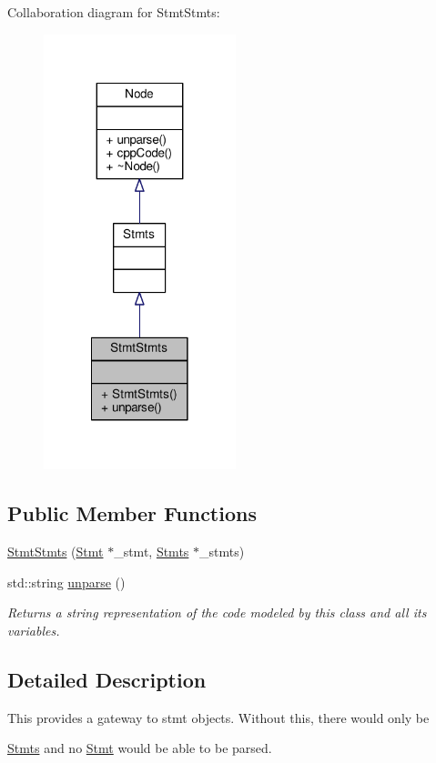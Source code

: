 Collaboration diagram for Stmt\-Stmts\-:\nopagebreak
\begin{figure}[H]
\begin{center}
\leavevmode
\includegraphics[width=158pt]{classStmtStmts__coll__graph}
\end{center}
\end{figure}
\subsection*{Public Member Functions}
\begin{DoxyCompactItemize}
\item 
\hyperlink{classStmtStmts_a41bd52f6dc41274d39f74fd58033f653}{Stmt\-Stmts} (\hyperlink{classStmt}{Stmt} $\ast$\-\_\-stmt, \hyperlink{classStmts}{Stmts} $\ast$\-\_\-stmts)
\item 
std\-::string \hyperlink{classStmtStmts_ae1cfeb7d7f0c155c6be7b42614954a23}{unparse} ()
\begin{DoxyCompactList}\small\item\em Returns a string representation of the code modeled by this class and all its variables. \end{DoxyCompactList}\end{DoxyCompactItemize}


\subsection{Detailed Description}
This provides a gateway to stmt objects. Without this, there would only be \par
 \hyperlink{classStmts}{Stmts} and no \hyperlink{classStmt}{Stmt} would be able to be parsed. 

